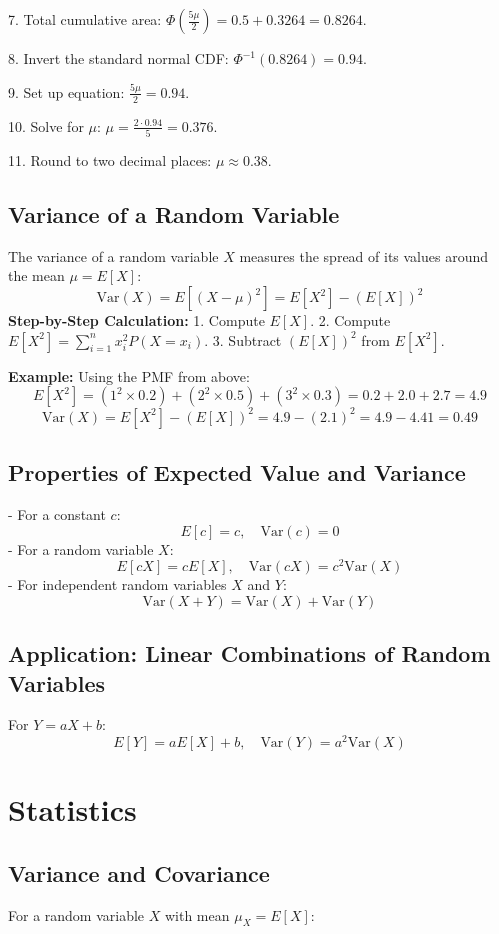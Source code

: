 \documentclass{article}
\begin{document}
\begin{multicols}{2}
7. Total cumulative area: \( \Phi\left( \frac{5\mu}{2} \right) = 0.5 + 0.3264 = 0.8264 \).

8. Invert the standard normal CDF: \( \Phi^{-1}(0.8264) = 0.94 \).

9. Set up equation: \( \frac{5\mu}{2} = 0.94 \).

10. Solve for \( \mu \): \( \mu = \frac{2 \cdot 0.94}{5} = 0.376 \).

11. Round to two decimal places: \( \mu \approx 0.38 \).


\subsection*{Variance of a Random Variable}
The variance of a random variable \( X \) measures the spread of its values around the mean \( \mu = E[X] \):
\[
\text{Var}(X) = E[(X - \mu)^2] = E[X^2] - (E[X])^2
\]
\textbf{Step-by-Step Calculation:}
1. Compute \( E[X] \).
2. Compute \( E[X^2] = \sum_{i=1}^n x_i^2 P(X = x_i) \).
3. Subtract \( (E[X])^2 \) from \( E[X^2] \).

\textbf{Example:}
Using the PMF from above:
\[
E[X^2] = (1^2 \times 0.2) + (2^2 \times 0.5) + (3^2 \times 0.3) = 0.2 + 2.0 + 2.7 = 4.9
\]
\[
\text{Var}(X) = E[X^2] - (E[X])^2 = 4.9 - (2.1)^2 = 4.9 - 4.41 = 0.49
\]

\subsection*{Properties of Expected Value and Variance}
- For a constant \( c \):
\[
E[c] = c, \quad \text{Var}(c) = 0
\]
- For a random variable \( X \):
\[
E[cX] = cE[X], \quad \text{Var}(cX) = c^2\text{Var}(X)
\]
- For independent random variables \( X \) and \( Y \):
\[
\text{Var}(X + Y) = \text{Var}(X) + \text{Var}(Y)
\]

\subsection*{Application: Linear Combinations of Random Variables}
For \( Y = aX + b \):
\[
E[Y] = aE[X] + b, \quad \text{Var}(Y) = a^2\text{Var}(X)
\]

\section*{Statistics}

\subsection*{Variance and Covariance}
For a random variable \(X\) with mean \(\mu_X = E[X]\):


\end{multicols}
\end{document}
